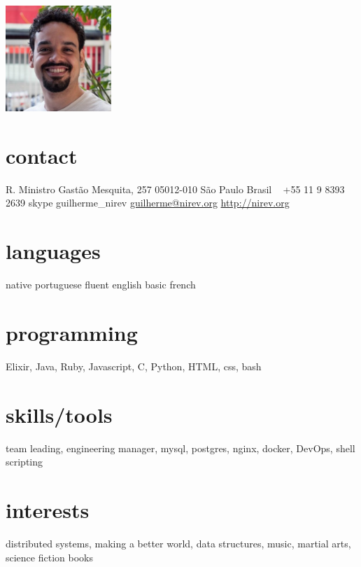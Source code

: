 \documentclass{nirev-cv}
\begin{document}
       {}


\begin{aside}
  \includegraphics[width=4cm]{profile.jpg}
  \section{contact}
    R. Ministro Gastão Mesquita, 257
    05012-010 São Paulo
    Brasil
    ~
    +55 11 9 8393 2639
    {\footnotesize skype} guilherme\_nirev
    \href{mailto:guilherme@nirev.org}{guilherme@nirev.org}
    \href{http://nirev.org}{http://nirev.org}
  \section{languages}
    native portuguese
    fluent english
    basic french
  \section{programming}
    Elixir, Java, Ruby, Javascript, C, Python,
    HTML, css, bash
  \section{skills/tools}
    team leading, engineering manager,
    mysql, postgres,
    nginx, docker, DevOps,
    shell scripting
  \section{interests}
distributed systems, making a better world, data structures, music, martial arts, science fiction books
\end{aside}
\end{document}
